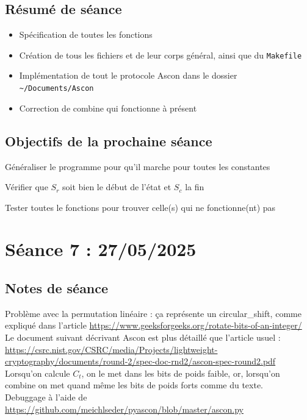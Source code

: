 \documentclass[12pt]{article}
\newcommand{\cmark}{\ding{51}}%
\newcommand{\done}{\rlap{$\square$}{\raisebox{2pt}{\large\hspace{1pt}\cmark}}%
	\hspace{-2.5pt}}
\begin{document}
	\subsection{Résumé de séance}
	\begin{itemize}
		\item Spécification de toutes les fonctions
		\item Création de tous les fichiers et de leur corps général, ainsi que du \verb|Makefile|
		\item Implémentation de tout le protocole Ascon dans le dossier \verb|~/Documents/Ascon|
		\item Correction de combine qui fonctionne à présent
	\end{itemize}
	
	\subsection{Objectifs de la prochaine séance}
	\begin{todolist}
		\item[\done] Généraliser le programme pour qu'il marche pour toutes les constantes
		\item[\done] Vérifier que $S_r$ soit bien le début de l'état et $S_c$ la fin
		\item[\done] Tester toutes le fonctions pour trouver celle(s) qui ne fonctionne(nt) pas
	\end{todolist}
	
	
	\section{Séance 7 : 27/05/2025}
	\subsection{Notes de séance}
	Problème avec la permutation linéaire : ça représente un circular\_shift, comme expliqué dans l'article \url{https://www.geeksforgeeks.org/rotate-bits-of-an-integer/} \\
	Le document suivant décrivant Ascon est plus détaillé que l'article usuel : \url{https://csrc.nist.gov/CSRC/media/Projects/lightweight-cryptography/documents/round-2/spec-doc-rnd2/ascon-spec-round2.pdf}\\
	\warning Lorsqu'on calcule $C_t$, on le met dans les bits de poids faible, or, lorsqu'on combine on met quand même les bits de poids forts comme du texte.\\
	Debuggage à l'aide de \url{https://github.com/meichlseder/pyascon/blob/master/ascon.py}
	
\end{document}
